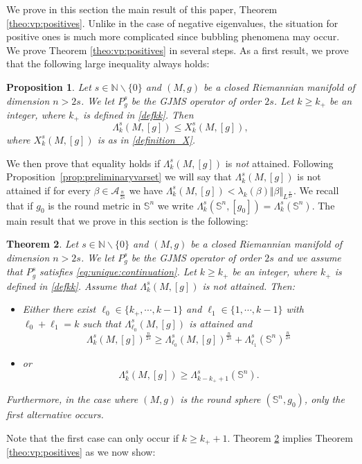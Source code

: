 \documentclass[10pt]{amsart}
\numberwithin{equation}{section}
\def\La{{\Lambda}}
\theoremstyle{plain}
\newtheorem{theo}{Theorem}[section]%
\newtheorem{prop}[theo]{Proposition}%
\theoremstyle{remark}
\begin{document}
We prove in this section the main result of this paper, Theorem \ref{theo:vp:positives}. Unlike in the case of negative eigenvalues, the situation for positive ones is much more complicated since bubbling phenomena may occur. We prove Theorem \ref{theo:vp:positives} in several steps. As a first result, we prove that the following large inequality always holds:
\begin{prop} \label{prop_ineg_large}
Let $s \in \mathbb{N} \backslash \{0\}$ and $(M,g)$ be a closed Riemannian manifold of dimension $n > 2s$. We let $P_g^s$ be the GJMS operator of order $2s$. Let $k \geq k_+$ be an integer, where $k_+$ is defined in \eqref{defkk}. Then 
 $$\La_k^s(M,[g]) \leq  X_k^s(M,[g]),$$ 
where $X_k^s(M,[g])$ is as in \eqref{definition_X}.
\end{prop}
We then prove that equality holds if $\La_k^s(M,[g]) $ is \emph{not} attained. Following Proposition~\ref{prop:preliminaryvarset} we will say that $\Lambda_k^s(M,[g])$ is not attained if for every $\beta \in \mathcal{A}_{\frac{n}{2s}}$ we have $\La_k^s(M,[g]) < \lambda_k(\beta) \Vert \beta \Vert_{L^{\frac{n}{2s}}}$. We recall that if $g_0$ is the round metric in $\mathbb{S}^n$ we write $\Lambda_k^s(\mathbb{S}^n, [g_0]) = \Lambda_k^s(\mathbb{S}^n)$.  The main result that we prove in this section is the following:
\begin{theo} \label{prop:bubbling}
Let $s \in \mathbb{N} \backslash \{0\}$ and $(M,g)$ be a closed Riemannian manifold of dimension $n > 2s$. We let $P_g^s$ be the GJMS operator of order $2s$ and we assume that $P_g^s$ satisfies \eqref{eq:unique:continuation}. Let $k \geq k_+$ be an integer, where $k_+$ is defined in \eqref{defkk}. Assume that $\La_k^s(M,[g])$ is not attained. Then:
\begin{itemize}
\item Either there exist $\ell_0 \in \{k_+, \cdots, k-1\}$ and $\ell_1 \in \{1, \cdots, k-1\}$ with $\ell_0 + \ell_1 = k$ such that $\Lambda_{\ell_0}^s(M,[g])$ is attained and
$$ \La_k^s(M,[g])^{\frac{n}{2s}} \ge  \La_{\ell_0}^s(M,[g])^{\frac{n}{2s}}  + \La_{\ell_1}^s(\mathbb{S}^n)^{\frac{n}{2s}} $$
\item or 
$$  \La_k^s(M,[g]) \ge  \La_{k-{k_+}+1}^s(\mathbb{S}^n). $$
\end{itemize}
Furthermore, in the case where $(M,g)$ is the round sphere $(\mathbb{S}^n, g_0)$, only the first alternative occurs. 
\end{theo}
Note that the first case can only occur if $k \ge k_++1$. Theorem \ref{prop:bubbling} implies Theorem \ref{theo:vp:positives} as we now show:
\end{document}
